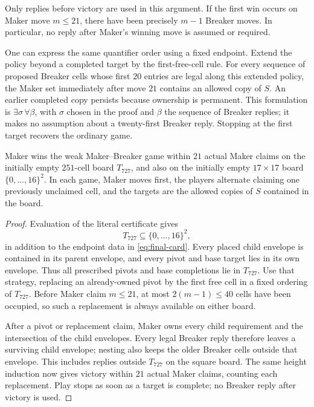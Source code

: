 Only replies before victory are used in this argument. If the first
win occurs on Maker move $m\le21$, there have been precisely $m-1$
Breaker moves. In particular, no reply after Maker's winning move
is assumed or required.

One can express the same quantifier order using a fixed endpoint.
Extend the policy beyond a completed target by the first-free-cell
rule. For every sequence of proposed Breaker cells whose first
$20$ entries are legal along this extended policy, the Maker set
immediately after move $21$ contains an allowed copy of $S$.
An earlier completed copy persists because ownership is permanent.
This formulation is $\exists\sigma\,\forall\beta$, with $\sigma$
chosen in the proof and $\beta$ the sequence of Breaker replies;
it makes no assumption about a twenty-first Breaker reply.
Stopping at the first target recovers the ordinary game.

\begin{corollary}\label{cor:finite-board}
Maker wins the weak Maker--Breaker game within $21$ actual Maker
claims on the initially empty $251$-cell board $T_{727}$, and also
on the initially empty $17\times17$ board $\{0,\ldots,16\}^2$.
In each game, Maker moves first, the players alternate claiming one
previously unclaimed cell, and the targets are the allowed copies
of $S$ contained in the board.
\end{corollary}

\begin{proof}
Evaluation of the literal certificate gives
\[
 T_{727}\subseteq\{0,\ldots,16\}^2,
\]
in addition to the endpoint data in \eqref{eq:final-card}.
Every placed child envelope is contained in its parent envelope,
and every pivot and base target lies in its own envelope. Thus all
prescribed pivots and base completions lie in $T_{727}$.
Use that strategy, replacing an already-owned pivot by the first
free cell in a fixed ordering of $T_{727}$. Before Maker claim
$m\le21$, at most $2(m-1)\le40$ cells have been occupied, so such
a replacement is always available on either board.

After a pivot or replacement claim, Maker owns every child
requirement and the intersection of the child envelopes. Every
legal Breaker reply therefore leaves a surviving child envelope;
nesting also keeps the older Breaker cells outside that envelope.
This includes replies outside $T_{727}$ on the square board.
The same height induction now gives victory within $21$ actual
Maker claims, counting each replacement. Play stops as soon as a
target is complete; no Breaker reply after victory is used.
\end{proof}

